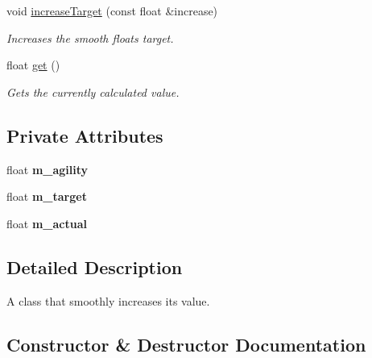 \begin{DoxyCompactItemize}
void \hyperlink{classflounder_1_1smoothfloat_a47a9df312c81c9a9c8f5bc8df3b886a1}{increase\+Target} (const float \&increase)
\begin{DoxyCompactList}\small\item\em Increases the smooth floats target. \end{DoxyCompactList}\item 
float \hyperlink{classflounder_1_1smoothfloat_a69103986400ad1181e516ba37c73804e}{get} ()
\begin{DoxyCompactList}\small\item\em Gets the currently calculated value. \end{DoxyCompactList}\end{DoxyCompactItemize}
\subsection*{Private Attributes}
\begin{DoxyCompactItemize}
\item 
\mbox{\label{classflounder_1_1smoothfloat_a12c7af68c4593ac56937a67a361ff68c}} 
float {\bfseries m\+\_\+agility}
\item 
\mbox{\label{classflounder_1_1smoothfloat_a93282a9c33a29a59439f0f15732b8616}} 
float {\bfseries m\+\_\+target}
\item 
\mbox{\label{classflounder_1_1smoothfloat_a4f912b967036d670c447dfd61ec10194}} 
float {\bfseries m\+\_\+actual}
\end{DoxyCompactItemize}


\subsection{Detailed Description}
A class that smoothly increases its value. 



\subsection{Constructor \& Destructor Documentation}
\mbox{\label{classflounder_1_1smoothfloat_a4a893f989019e779fa377f6ef5576121}} 
